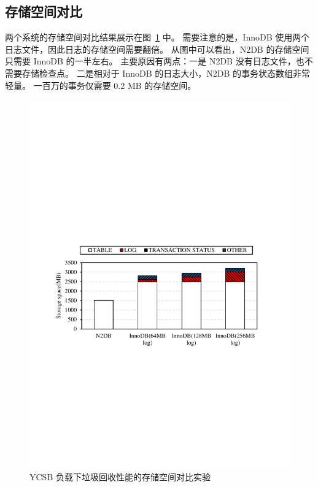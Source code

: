 \subsection{存储空间对比}

两个系统的存储空间对比结果展示在图~\ref{fig:recovery-storage-ycsb} 中。
需要注意的是，InnoDB 使用两个日志文件，因此日志的存储空间需要翻倍。
从图中可以看出，N2DB 的存储空间只需要 InnoDB 的一半左右。
主要原因有两点：一是 N2DB 没有日志文件，也不需要存储检查点。
二是相对于 InnoDB 的日志大小，N2DB 的事务状态数组非常轻量。
一百万的事务仅需要 0.2 MB 的存储空间。

\begin{figure}
    \centering
    \includegraphics[width=15cm, trim={1cm 9cm 1cm 10cm}]{figures/recovery-storage.pdf}
    \caption{YCSB 负载下垃圾回收性能的存储空间对比实验}
    \label{fig:recovery-storage-ycsb}
\end{figure}



